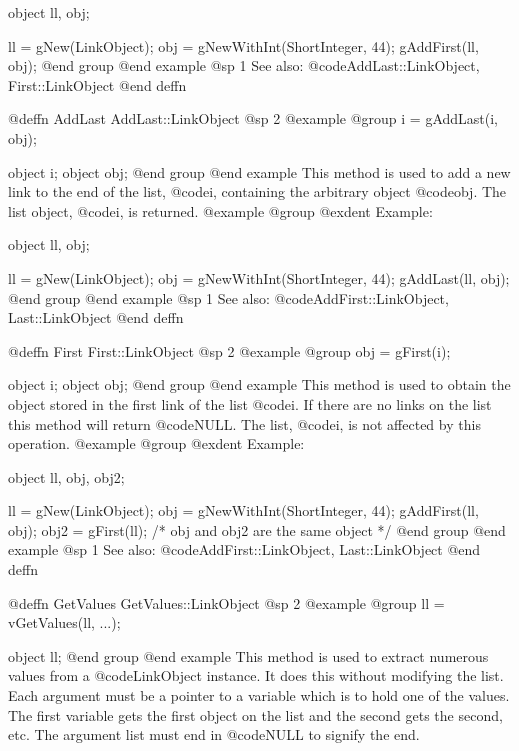 object  ll, obj;

ll = gNew(LinkObject);
obj = gNewWithInt(ShortInteger, 44);
gAddFirst(ll, obj);
@end group
@end example
@sp 1
See also:  @code{AddLast::LinkObject, First::LinkObject}
@end deffn







@deffn {AddLast} AddLast::LinkObject
@sp 2
@example
@group
i = gAddLast(i, obj);

object  i;
object  obj;
@end group
@end example
This method is used to add a new link to the end of the list,
@code{i}, containing the arbitrary object @code{obj}.  The list object,
@code{i}, is returned.
@example
@group
@exdent Example:

object  ll, obj;

ll = gNew(LinkObject);
obj = gNewWithInt(ShortInteger, 44);
gAddLast(ll, obj);
@end group
@end example
@sp 1
See also:  @code{AddFirst::LinkObject, Last::LinkObject}
@end deffn











@deffn {First} First::LinkObject
@sp 2
@example
@group
obj = gFirst(i);

object  i;
object  obj;
@end group
@end example
This method is used to obtain the object stored in the first link of the
list @code{i}.  If there are no links on the list this method will
return @code{NULL}.  The list, @code{i}, is not affected by this operation.
@example
@group
@exdent Example:

object  ll, obj, obj2;

ll = gNew(LinkObject);
obj = gNewWithInt(ShortInteger, 44);
gAddFirst(ll, obj);
obj2 = gFirst(ll);
/* obj and obj2 are the same object  */
@end group
@end example
@sp 1
See also:  @code{AddFirst::LinkObject, Last::LinkObject}
@end deffn













@deffn {GetValues} GetValues::LinkObject
@sp 2
@example
@group
ll = vGetValues(ll, ...);

object  ll;
@end group
@end example
This method is used to extract numerous values from a @code{LinkObject} instance.
It does this without modifying the list.  Each argument must be a pointer to a
variable which is to hold one of the values.  The first variable gets the first
object on the list and the second gets the second, etc.  The argument list must
end in @code{NULL} to signify the end.


